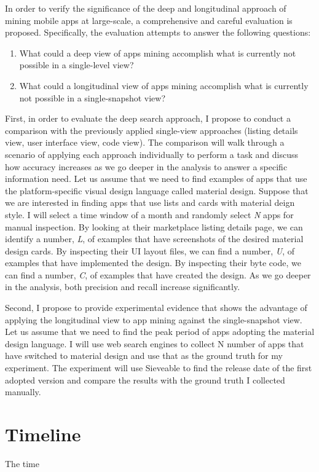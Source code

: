 In order to verify the significance of the deep and longitudinal approach of mining mobile apps at large-scale, a comprehensive and careful evaluation is proposed.
Specifically, the evaluation attempts to answer the following questions:
\begin{enumerate}
	\item What could a deep view of apps mining accomplish what is currently not possible in a single-level view?
	\item What could a longitudinal view of apps mining accomplish what is currently not possible in a single-snapshot view?
\end{enumerate}

First, in order to evaluate the deep search approach, I propose to conduct a comparison with the previously applied single-view approaches (listing details view, user interface view, code view).
The comparison will walk through a scenario of applying each approach individually to perform a task and discuss how accuracy increases as we go deeper in the analysis to answer a specific information need.
Let us assume that we need to find examples of apps that use the platform-specific visual design language called material design.
Suppose that we are interested in finding apps that use lists and cards with material deign style.
I will select a time window of a month and randomly select \textit{N} apps for manual inspection.
By looking at their marketplace listing details page, we can identify a number, \textit{L}, of examples that have screenshots of the desired material design cards.
By inspecting their UI layout files, we can find a number, \textit{U}, of examples that have implemented the design.
By inspecting their byte code, we can find a number, \textit{C}, of examples that have created the design.
As we go deeper in the analysis, both precision and recall increase significantly.

Second, I propose to provide experimental evidence that shows the advantage of applying the longitudinal view to app mining against the single-snapshot view.
Let us assume that we need to find the peak period of apps adopting the material design language.
I will use web search engines to collect N number of apps that have switched to material design and use that as the ground truth for my experiment.
The experiment will use Sieveable to find the release date of the first adopted version and compare the results with the ground truth I collected manually.

\section{Timeline}

The time


